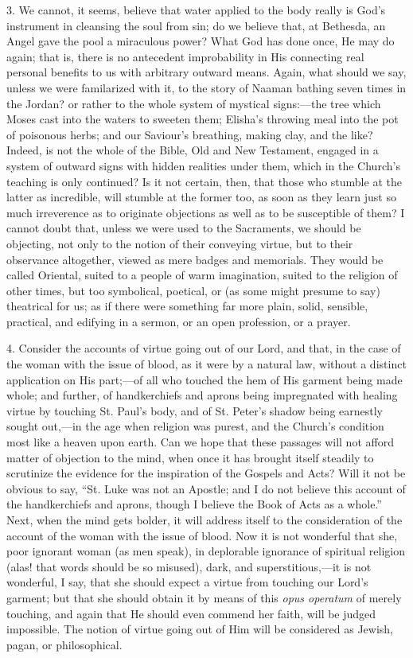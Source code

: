 3. We cannot, it seems, believe that water applied to the body
really is God's instrument in cleansing the soul from sin; do we
believe that, at Bethesda, an Angel gave the pool a miraculous power?
What God has done once, He may do again; that is, there is no
antecedent improbability in His connecting real personal benefits to
us with arbitrary outward means. Again, what should we say, unless we
were familarized with it, to the story of Naaman bathing seven times
in the Jordan? or rather to the whole system of mystical signs:—the
tree which Moses cast into the waters to sweeten them; Elisha's
throwing meal into the pot of poisonous herbs; and our Saviour's
breathing, making clay, and the like? Indeed, is not the whole of the
Bible, Old and New Testament, engaged in a system of outward signs
with hidden realities under them, which in the Church's teaching
is only continued? Is it not certain, then, that those who stumble at
the latter as incredible, will stumble at the former too, as soon as
they learn just so much irreverence as to originate objections as well
as to be susceptible of them? I cannot doubt that, unless we were used
to the Sacraments, we should be objecting, not only to the notion of
their conveying virtue, but to their observance altogether, viewed as
mere badges and memorials. They would be called Oriental, suited to a
people of warm imagination, suited to the religion of other times, but
too symbolical, poetical, or (as some might presume to say) theatrical
for us; as if there were something far more plain, solid, sensible,
practical, and edifying in a sermon, or an open profession, or a
prayer.

4. Consider the accounts of virtue going out of our Lord, and that,
in the case of the woman with the issue of blood, as it were by a
natural law, without a distinct application on His part;—of all who
touched the hem of His garment being made whole; and further, of
handkerchiefs and aprons being impregnated with healing virtue by
touching St. Paul's body, and of St. Peter's shadow being earnestly
sought out,—in the age when religion was purest, and the Church's
condition most like a heaven upon earth. Can we hope that these
passages will not afford matter of objection to the mind, when once it
has brought itself steadily to scrutinize the evidence for the
inspiration of the Gospels and Acts? Will it not be obvious to say,
``St. Luke was not an Apostle; and I do not believe this account
of the handkerchiefs and aprons, though I believe the Book of Acts as
a whole.'' Next, when the mind gets bolder, it will address itself
to the consideration of the account of the woman with the issue
of blood. Now it is not wonderful that she, poor ignorant woman (as
men speak), in deplorable ignorance of spiritual religion (alas! that
words should be so misused), dark, and superstitious,—it is not
wonderful, I say, that she should expect a virtue from touching our
Lord's garment; but that she should obtain it by means of this \emph{opus
operatum} of merely touching, and again that He should even commend
her faith, will be judged impossible. The notion of virtue going out
of Him will be considered as Jewish, pagan, or philosophical.

